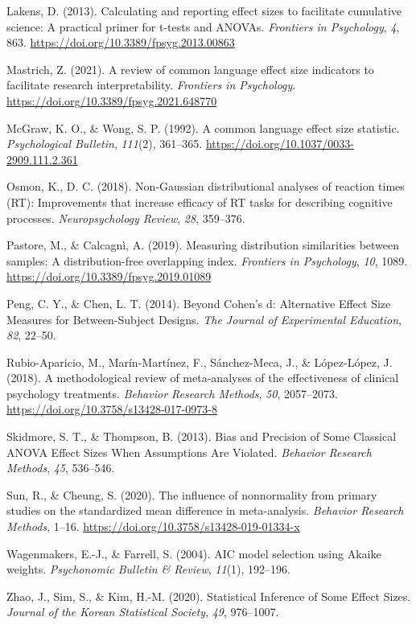 \documentclass[
  12pt,
  a4paper,
  DIV=11,
  numbers=noendperiod]{scrartcl}
\newlength{\cslhangindent}
\newenvironment{CSLReferences}[2] %
 {\begin{list}{}{%
  \setlength{\itemindent}{0pt}
  \setlength{\leftmargin}{0pt}
  \setlength{\parsep}{0pt}
  \ifodd #1
   \setlength{\leftmargin}{\cslhangindent}
   \setlength{\itemindent}{-1\cslhangindent}
  \fi
  \setlength{\itemsep}{#2\baselineskip}}}
 {\end{list}}
\begin{document}
\begin{CSLReferences}{1}{0}
Lakens, D. (2013). {Calculating and reporting effect sizes to facilitate
cumulative science: A practical primer for t-tests and ANOVAs}.
\emph{Frontiers in Psychology}, \emph{4}, 863.
\url{https://doi.org/10.3389/fpsyg.2013.00863}

Mastrich, Z. (2021). {A review of common language effect size indicators
to facilitate research interpretability}. \emph{Frontiers in
Psychology}. \url{https://doi.org/10.3389/fpsyg.2021.648770}

McGraw, K. O., \& Wong, S. P. (1992). {A common language effect size
statistic}. \emph{Psychological Bulletin}, \emph{111}(2), 361--365.
\url{https://doi.org/10.1037/0033-2909.111.2.361}

Osmon, K., D. C. (2018). {Non-Gaussian distributional analyses of
reaction times (RT): Improvements that increase efficacy of RT tasks for
describing cognitive processes.} \emph{Neuropsychology Review},
\emph{28}, 359--376.

Pastore, M., \& Calcagnì, A. (2019). {Measuring distribution
similarities between samples: A distribution-free overlapping index}.
\emph{Frontiers in Psychology}, \emph{10}, 1089.
\url{https://doi.org/10.3389/fpsyg.2019.01089}

Peng, C. Y., \& Chen, L. T. (2014). {Beyond Cohen's d: Alternative
Effect Size Measures for Between-Subject Designs}. \emph{The Journal of
Experimental Education}, \emph{82}, 22--50.

Rubio-Aparicio, M., Marín-Martínez, F., Sánchez-Meca, J., \&
López-López, J. (2018). {A methodological review of meta-analyses of the
effectiveness of clinical psychology treatments}. \emph{Behavior
Research Methods}, \emph{50}, 2057--2073.
\url{https://doi.org/10.3758/s13428-017-0973-8}

Skidmore, S. T., \& Thompson, B. (2013). {Bias and Precision of Some
Classical ANOVA Effect Sizes When Assumptions Are Violated}.
\emph{Behavior Research Methods}, \emph{45}, 536--546.

Sun, R., \& Cheung, S. (2020). {The influence of nonnormality from
primary studies on the standardized mean difference in meta-analysis}.
\emph{Behavior Research Methods}, 1--16.
\url{https://doi.org/10.3758/s13428-019-01334-x}

Wagenmakers, E.-J., \& Farrell, S. (2004). {AIC} model selection using
{A}kaike weights. \emph{Psychonomic Bulletin \& Review}, \emph{11}(1),
192--196.

Zhao, J., Sim, S., \& Kim, H.-M. (2020). {Statistical Inference of Some
Effect Sizes}. \emph{Journal of the Korean Statistical Society},
\emph{49}, 976--1007.

\end{CSLReferences}
\end{document}
